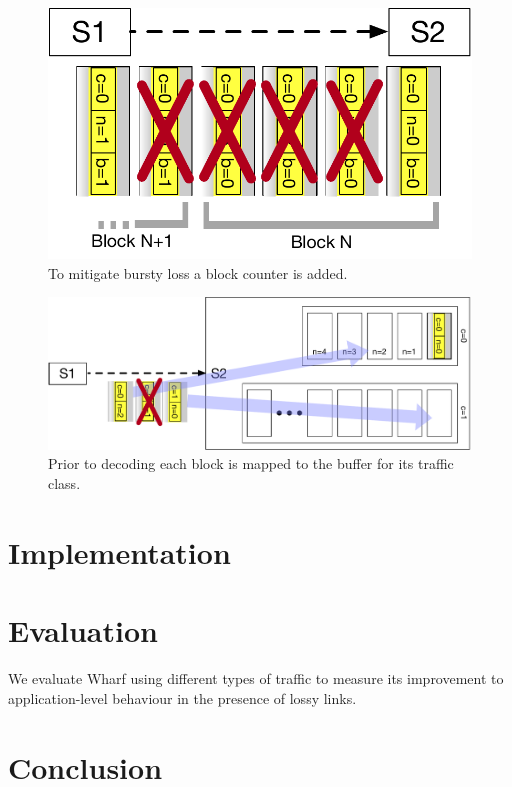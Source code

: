 \documentclass[sigconf]{acmart}
\newcommand{\OurSys}{Wharf\xspace}
\begin{document}
\begin{figure}
  \centering
  \includegraphics[width=0.4\paperwidth]{loss_example2.pdf}
  \caption{\label{fig:example-loss2}To mitigate bursty loss a block counter is added.}
\end{figure}

\begin{figure}
  \centering
  \includegraphics[width=0.4\paperwidth]{decode_example.pdf}
  \caption{\label{fig:example-decode}Prior to decoding each block is mapped to the buffer for its traffic class.}
\end{figure}


\section{Implementation}
\label{sec:implementation}
\section{Evaluation}
We evaluate \OurSys using different types of traffic to measure its improvement
to application-level behaviour in the presence of lossy links.


\section{Conclusion}



\end{document}
